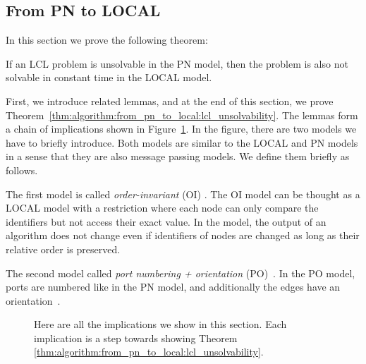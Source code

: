 \newpage
\subsection{From PN to LOCAL} \label{sec:algorithm:from_pn_to_local}

In this section we prove the following theorem:
\begin{theorem} \label{thm:algorithm:from_pn_to_local:lcl_unsolvability}
    If an LCL problem is unsolvable in the PN model, then the problem is also not solvable in constant time in the LOCAL model.
\end{theorem}

First, we introduce related lemmas, and at the end of this section, we prove Theorem~\ref{thm:algorithm:from_pn_to_local:lcl_unsolvability}.
The lemmas form a chain of implications shown in Figure~\ref{fig:proof_order:lcl_unsolvability}.
In the figure, there are two models we have to briefly introduce.
Both models are similar to the LOCAL and PN models in a sense that they are also message passing models.
We define them briefly as follows.

The first model is called \emph{order-invariant} (OI) \cite{DBLP:journals/siamcomp/NaorS95}.
The OI model can be thought as a LOCAL model with a restriction where each node can only compare the identifiers but not access their exact value.
In the model, the output of an algorithm does not change even if identifiers of nodes are changed as long as their relative order is preserved.

The second model called \emph{port numbering + orientation} (PO)~\cite{DBLP:conf/istcs/MayerNS95}.
In the PO model, ports are numbered like in the PN model, and additionally the edges have an orientation~\cite{DBLP:journals/dc/GoosHS17}.


\begin{figure}[H]
   \centering
    \caption{Here are all the implications we show in this section.
    Each implication is a step towards showing Theorem \ref{thm:algorithm:from_pn_to_local:lcl_unsolvability}.
    }
   \label{fig:proof_order:lcl_unsolvability}
\end{figure}

